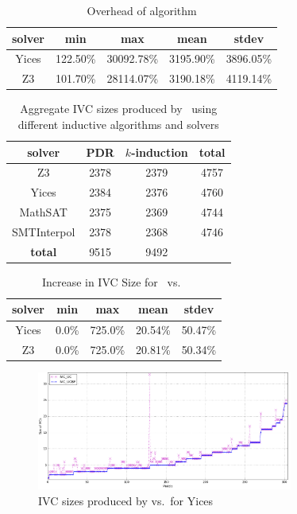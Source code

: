 \begin{table}
  \centering
  \begin{tabular}{ |c||c|c|c|c| }
    \hline
     solver & min & max & mean & stdev \\[0.5ex]
    \hline
    Yices & 122.50\%  & 30092.78\%   & 3195.90\% & 3896.05\% \\[0.5ex]
    \hline
    Z3 & 101.70\%  & 28114.07\%   & 3190.18\% & 4119.14\% \\[0.5ex]
    \hline
  \end{tabular}
  \caption{Overhead of \ucbfalg algorithm}
  \label{tab:overhead-ucbfalg}
\end{table}

\begin{table}
  \centering
  \begin{tabular}{ |c|c|c|c| }
    \hline
     solver & PDR & $k$-induction & \textbf{total} \\
    \hline
      Z3 & 2378 & 2379 & 4757 \\
      Yices & 2384 & 2376 & 4760 \\
      MathSAT & 2375 & 2369 & 4744 \\
      SMTInterpol & 2378 & 2368 & 4746 \\
    \hline
      \textbf{total} & 9515 & 9492 &   \\
    \hline
  \end{tabular}
  \caption{Aggregate IVC sizes produced by \ucalg\ using different inductive algorithms and solvers}
  \label{tab:minimality-algorithm-solvers}
\end{table}

\begin{table}
  \centering
   
  \begin{tabular}{ |c||c|c|c|c| }
    \hline
     solver & min & max & mean & stdev \\[0.5ex]
    \hline
    Yices &   0.0\%   & 725.0\% & 20.54\% & 50.47\% \\[0.5ex]
    Z3 &   0.0\%   & 725.0\% & 20.81\% & 50.34\% \\[0.5ex]
    \hline
  \end{tabular}
  \caption{Increase in IVC Size for \ucalg\ vs.\ \ucbfalg}
  \label{tab:increase-ucalg-ucbfalg}
\end{table}


\begin{figure}
  \centering
  \includegraphics[width=0.75\textwidth]{figs/minimality.png}
  \caption{IVC sizes produced by \ucalg vs.\ \ucbfalg for Yices}
  \vspace{-0.1in}
  \label{fig:minimality-all}
\end{figure}

